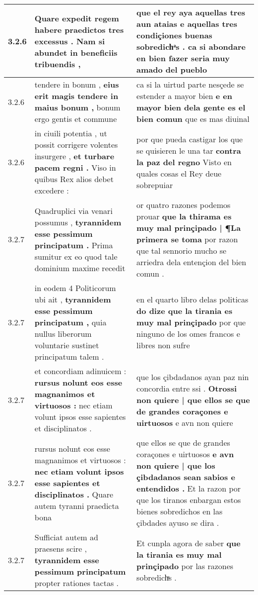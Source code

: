 \begin{tabular}{|p{1cm}|p{6.5cm}|p{6.5cm}|}
3.2.6 & Quare expedit regem \textbf{ habere praedictos tres excessus . } Nam si abundet in beneficiis tribuendis , & que el rey aya aquellas tres aun ataias \textbf{ e aquellas tres condiçiones buenas sobredichͣs . } ca si abondare en bien fazer seria muy amado del pueblo \\\hline
3.2.6 & tendere in bonum , \textbf{ eius erit magis tendere in maius bonum , } bonum ergo gentis et commune & ca si la uirtud parte nesçede se estender a mayor bien \textbf{ e en mayor bien dela gente es el bien comun } que es mas diuinal \\\hline
3.2.6 & in ciuili potentia , ut possit corrigere volentes insurgere , \textbf{ et turbare pacem regni . } Viso in quibus Rex alios debet excedere : & por que pueda castigar los que se quisieren le una tar \textbf{ contra la paz del regno } Visto en quales cosas el Rey deue sobrepuiar \\\hline
3.2.7 & Quadruplici via venari possumus , \textbf{ tyrannidem esse pessimum principatum . } Prima sumitur ex eo quod tale dominium maxime recedit & or quatro razones podemos prouar \textbf{ que la thirama es muy mal prinçipado | ¶La primera se toma } por razon que tal sennorio mucho se arriedra dela entençion del bien comun . \\\hline
3.2.7 & in eodem 4 Politicorum ubi ait , \textbf{ tyrannidem esse pessimum principatum , } quia nullus liberorum voluntarie sustinet principatum talem . & en el quarto libro delas politicas \textbf{ do dize que la tirania es muy mal prinçipado } por que ninguno de los omes francos e libres non sufre \\\hline
3.2.7 & et concordiam adinuicem : \textbf{ rursus nolunt eos esse magnanimos et virtuosos : } nec etiam volunt ipsos esse sapientes et disciplinatos . & que los çibdadanos ayan paz nin concordia entre ssi . \textbf{ Otrossi non quiere | que ellos se que de grandes coraçones e uirtuosos } e avn non quiere \\\hline
3.2.7 & rursus nolunt eos esse magnanimos et virtuosos : \textbf{ nec etiam volunt ipsos esse sapientes et disciplinatos . } Quare autem tyranni praedicta bona & que ellos se que de grandes coraçones e uirtuosos \textbf{ e avn non quiere | que los çibdadanos sean sabios e entendidos . } Et la razon por que los tiranos enbargan estos bienes sobredichos en las çibdades ayuso se dira . \\\hline
3.2.7 & Sufficiat autem ad praesens scire , \textbf{ tyrannidem esse pessimum principatum } propter rationes tactas . & Et cunpla agora de saber \textbf{ que la tirania es muy mal prinçipado } por las razones sobredichͣs . \\\hline

\end{tabular}
